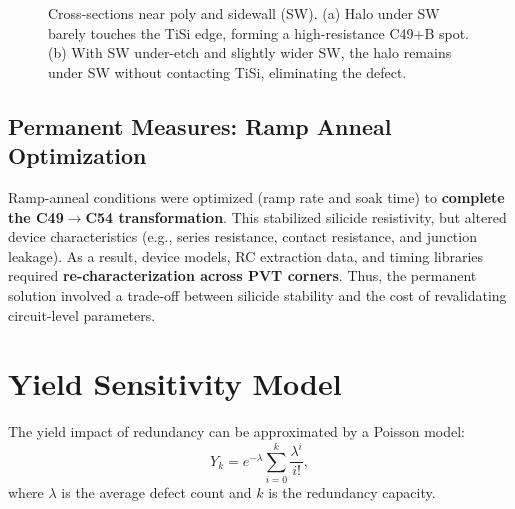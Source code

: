 \documentclass[conference]{IEEEtran}
\begin{document}
\begin{figure*}[!t]
{}
  \caption{Cross-sections near poly and sidewall (SW). (a) Halo under SW barely touches the TiSi edge, forming a high-resistance C49+B spot. (b) With SW under-etch and slightly wider SW, the halo remains under SW without contacting TiSi, eliminating the defect.}
  \label{fig:fig2_poly}
\end{figure*}

\subsection{Permanent Measures: Ramp Anneal Optimization}
Ramp-anneal conditions were optimized (ramp rate and soak time)
to \textbf{complete the C49$\rightarrow$C54 transformation}. This
stabilized silicide resistivity, but altered device characteristics
(e.g., series resistance, contact resistance, and junction leakage).
As a result, device models, RC extraction data, and timing libraries
required \textbf{re-characterization across PVT corners}. Thus, the
permanent solution involved a trade-off between silicide stability and
the cost of revalidating circuit-level parameters.

\section{Yield Sensitivity Model}
The yield impact of redundancy can be approximated by a Poisson model:
\[
Y_k = e^{-\lambda} \sum_{i=0}^{k} \frac{\lambda^i}{i!},
\]
where $\lambda$ is the average defect count and $k$ is the redundancy capacity.
\end{document}

